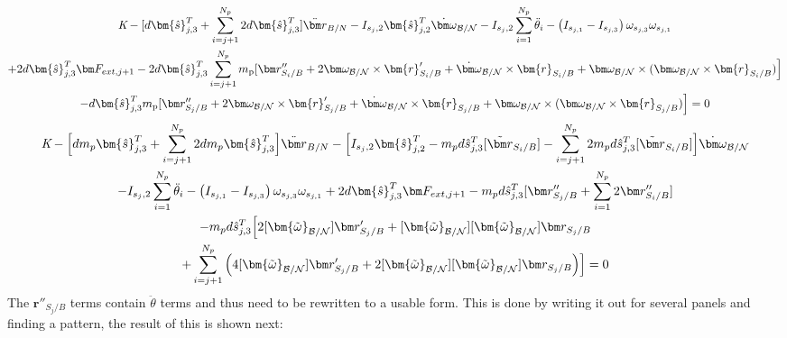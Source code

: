 \begin{multline}
	\textit{K} - [d\bm{\hat{s}}^{T}_{j,3}+\sum^{N_p}_{i=j+1}2d\bm{\hat{s}}^{T}_{j,3}]\ddot{\bm r}_{B/N} - I_{s_j,2} \bm{\hat{s}}_{j,2}^T \dot{\bm\omega}_{\cal B/N} - I_{s_j,2} \sum^{N_p}_{i=1}\ddot{\theta}_i - \left( I_{s_{j,1}} - I_{s_{j,3}}\right) \omega_{s_{j,3}} \omega_{s_{j,1}}\\
	+ 2d\bm{\hat{s}}^{T}_{j,3}\bm F_{ext,j+1} - 2d\bm{\hat{s}}^{T}_{j,3}\sum^{N_p}_{i=j+1}m_{\text{p}} [\bm r''_{S_{i}/B}+ 2 \bm\omega_{\cal B/N} \times \bm{r}'_{S_i/B} + \dot{\bm\omega}_{\cal B/N} \times \bm{r}_{S_i/B}
	+ \bm\omega_{\cal B/N} \times (\bm\omega_{\cal B/N} \times \bm{r}_{S_i/B})\Big] \\ - d\bm{\hat{s}}^{T}_{j,3} m_{\text{p}} [\bm r''_{S_{j}/B}+ 2 \bm\omega_{\cal B/N} \times \bm{r}'_{S_j/B} + \dot{\bm\omega}_{\cal B/N} \times \bm{r}_{S_j/B}
	+ \bm\omega_{\cal B/N} \times (\bm\omega_{\cal B/N} \times \bm{r}_{S_j/B})\Big] = 0 %
\end{multline}
\begin{multline}
	\textit{K} - \Big[d m_p\bm{\hat{s}}^{T}_{j,3}+\sum^{N_p}_{i=j+1}2 d m_p\bm{\hat{s}}^{T}_{j,3}\Big]\ddot{\bm r}_{B/N} - \Big[I_{s_j,2} \bm{\hat{s}}_{j,2}^T -m_p d \hat{s}^{T}_{j,3}[\tilde{{\bm r}}_{S_{i}/B}]-\sum^{N_p}_{i=j+1} 2 m_p d \hat{s}^{T}_{j,3}[\tilde{{\bm r}}_{S_{i}/B}]\Big]\dot{\bm\omega}_{\cal B/N} \\
	-I_{s_j,2} \sum^{N_p}_{i=1}\ddot{\theta}_i - \left( I_{s_{j,1}} - I_{s_{j,3}}\right) \omega_{s_{j,3}} \omega_{s_{j,1}}+ 2d\bm{\hat{s}}^{T}_{j,3}\bm F_{ext,j+1}
	-m_p d \hat{s}^{T}_{j,3}[\bm r''_{S_{j}/B} + \sum^{N_p}_{i=1} 2 \bm r''_{S_{i}/B}]\\
	-m_p d \hat{s}^{T}_{j,3}\Big[2[\bm{\tilde{\omega}}_{\cal B/N}]\bm r'_{S_{j}/B} + [\bm{\tilde{\omega}}_{\cal B/N}][\bm{\tilde{\omega}}_{\cal B/N}]\bm r_{S_{j}/B}\\
	+\sum^{N_p}_{i=j+1}\Big(4[\bm{\tilde{\omega}}_{\cal B/N}]\bm r'_{S_{j}/B}
	+ 2[\bm{\tilde{\omega}}_{\cal B/N}][\bm{\tilde{\omega}}_{\cal B/N}]\bm r_{S_{j}/B} \Big)\Big] = 0
\end{multline}
The $\bm r''_{S_{j}/B}$ terms contain $\ddot{\theta}$ terms and thus need to be rewritten to a usable form. This is done by writing it out for several panels and finding a pattern, the result of this is shown next:

